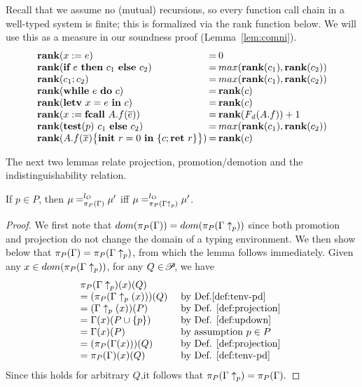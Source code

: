 {{{Recall that we assume no (mutual) recursions, so every function call
chain in a well-typed system is finite; this is formalized via the rank function below. We will use this
as a measure in our soundness proof (Lemma~\ref{lem:comni}).
\begin{equation*}
\arraycolsep=1.0pt\def\arraystretch{1}
\begin{array}{lcl}
\rank{\lcASS{x}{e}} & = &0\\
\rank{\lcIF{e}{c_1}{c_2}} & = &max(\rank{c_1}, \rank{c_2)}\\
\rank{\lcSEQ{c_1}{c_2}} & = &max(\rank{c_1}, \rank{c_2})\\
\rank{\lcWHILE{e}{c}} & = &\rank{c} \\
\rank{\lcLETVAR{x}{e}{c}} & = &\rank{c} \\
\rank{\lcCALL{x}{A.f}{\overline{e}}} & = &
   \rank{\FD(A.f)} + 1\\
\rank{\lcCP{p}{c_1}{c_2}} & = & max(\rank{c_1}, \rank{c_2})\\
\rank{\lpFUN{A.f}{\overline x}{c}} &=& \rank{c}
\end{array}
\end{equation*}


The next two lemmas relate projection, promotion/demotion
and the indistinguishability relation.

\begin{lemma}\label{lem:up}
If $p \in P$, then $\mu =_{\app{\Gamma}{P}}^{l_{O}} \mu'$ iff $\mu =_{\app{\Gamma\uparrow_{p}}{P}}^{l_{O}} \mu'$.
\end{lemma}
\begin{proof}
  We first note that $dom(\app{\Gamma}{P}) = dom(\app{\Gamma\uparrow_{p}}{P})$ since both
  promotion and projection do not change the domain of a typing environment.
  We then show below that $\app{\Gamma}{P} = \app{\Gamma\uparrow_p}{P}$, from which the
  lemma follows immediately.
  Given any $x \in dom(\app{\Gamma\uparrow_{p}}{P})$,
  for any $Q \in \PPS$, we have
  $$
  \begin{array}{ll}
    \app{\Gamma\uparrow_p}{P}(x)(Q) & \\
    = (\app{\Gamma\uparrow_p(x)}{P})(Q) & \mbox{ by Def.\ref{def:tenv-pd} }\\
    = (\Gamma\uparrow_p(x))(P) & \mbox{ by Def. \ref{def:projection} }\\
    = \Gamma(x)(P \cup \{p\}) & \mbox { by Def. \ref{def:updown} } \\
    = \Gamma(x)(P) & \mbox{ by assumption $p \in P$ }\\
    = (\app{\Gamma(x)}{P})(Q) & \mbox{ by Def. \ref{def:projection} }\\
    = \app{\Gamma}{P}(x)(Q) & \mbox{ by Def. \ref{def:tenv-pd} }
  \end{array}
  $$
  Since this holds for arbitrary $Q$,it follows that $\app{\Gamma\uparrow_p}{P} = \app{\Gamma}{P}.$
\end{proof}

}}}
